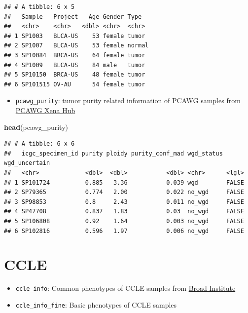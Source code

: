 \documentclass[
]{book}
\newenvironment{Shaded}{\begin{snugshade}}{\end{snugshade}}
\newcommand{\FunctionTok}[1]{\textcolor[rgb]{0.13,0.29,0.53}{\textbf{#1}}}
\newcommand{\NormalTok}[1]{#1}
\providecommand{\tightlist}{%
  \setlength{\itemsep}{0pt}\setlength{\parskip}{0pt}}
\begin{document}
\begin{verbatim}
## # A tibble: 6 x 5
##   Sample   Project   Age Gender Type  
##   <chr>    <chr>   <dbl> <chr>  <chr> 
## 1 SP1003   BLCA-US    53 female tumor 
## 2 SP1007   BLCA-US    53 female normal
## 3 SP10084  BRCA-US    64 female tumor 
## 4 SP1009   BLCA-US    84 male   tumor 
## 5 SP10150  BRCA-US    48 female tumor 
## 6 SP101515 OV-AU      54 female tumor
\end{verbatim}

\begin{itemize}
\tightlist
\item
  \texttt{pcawg\_purity}: tumor purity related information of PCAWG samples from \href{https://xenabrowser.net/datapages/?cohort=PCAWG\%20(specimen\%20centric)&removeHub=https\%3A\%2F\%2Fxena.treehouse.gi.ucsc.edu\%3A443}{PCAWG Xena Hub}
\end{itemize}

\begin{Shaded}
\begin{Highlighting}[]
\FunctionTok{head}\NormalTok{(pcawg\_purity)}
\end{Highlighting}
\end{Shaded}

\begin{verbatim}
## # A tibble: 6 x 6
##   icgc_specimen_id purity ploidy purity_conf_mad wgd_status wgd_uncertain
##   <chr>             <dbl>  <dbl>           <dbl> <chr>      <lgl>        
## 1 SP101724          0.885   3.36           0.039 wgd        FALSE        
## 2 SP79365           0.774   2.00           0.022 no_wgd     FALSE        
## 3 SP98853           0.8     2.43           0.011 no_wgd     FALSE        
## 4 SP47708           0.837   1.83           0.03  no_wgd     FALSE        
## 5 SP106808          0.92    1.64           0.003 no_wgd     FALSE        
## 6 SP102816          0.596   1.97           0.006 no_wgd     FALSE
\end{verbatim}

\section{CCLE}\label{ccle}

\begin{itemize}
\tightlist
\item
  \texttt{ccle\_info}: Common phenotypes of CCLE samples from \href{https://data.broadinstitute.org/ccle_legacy_data/cell_line_annotations/}{Broad Institute}
\item
  \texttt{ccle\_info\_fine}: Basic phenotypes of CCLE samples
\end{itemize}
\end{document}
